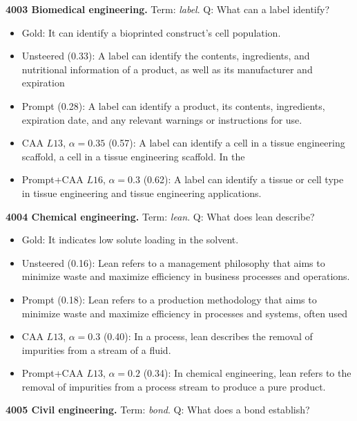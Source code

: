 \medskip\noindent\textbf{4003 Biomedical engineering.} Term: \emph{label}.
Q: What can a label identify?
\begin{itemize}\setlength{\itemsep}{0.15em}\setlength{\parsep}{0pt}\setlength{\topsep}{0.2em}
\item Gold: It can identify a bioprinted construct's cell population.
\item Unsteered (0.33): A label can identify the contents, ingredients, and nutritional information of a product, as well as its manufacturer and expiration
\item Prompt (0.28): A label can identify a product, its contents, ingredients, expiration date, and any relevant warnings or instructions for use.
\item CAA $L13$, $\alpha=0.35$ (0.57): A label can identify a cell in a tissue engineering scaffold, a cell in a tissue engineering scaffold. In the
\item Prompt+CAA $L16$, $\alpha=0.3$ (0.62): A label can identify a tissue or cell type in tissue engineering and tissue engineering applications.
\end{itemize}
\medskip\noindent\textbf{4004 Chemical engineering.} Term: \emph{lean}.
Q: What does lean describe?
\begin{itemize}\setlength{\itemsep}{0.15em}\setlength{\parsep}{0pt}\setlength{\topsep}{0.2em}
\item Gold: It indicates low solute loading in the solvent.
\item Unsteered (0.16): Lean refers to a management philosophy that aims to minimize waste and maximize efficiency in business processes and operations.
\item Prompt (0.18): Lean refers to a production methodology that aims to minimize waste and maximize efficiency in processes and systems, often used
\item CAA $L13$, $\alpha=0.3$ (0.40): In a process, lean describes the removal of impurities from a stream of a fluid.
\item Prompt+CAA $L13$, $\alpha=0.2$ (0.34): In chemical engineering, lean refers to the removal of impurities from a process stream to produce a pure product.
\end{itemize}
\medskip\noindent\textbf{4005 Civil engineering.} Term: \emph{bond}.
Q: What does a bond establish?

